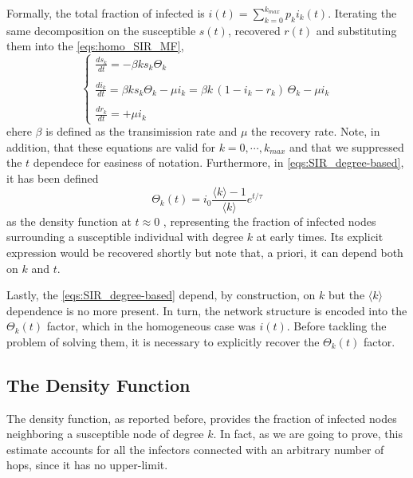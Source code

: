 \documentclass[a4paper,10pt,twoside]{book} %
\theoremstyle{definition}
\begin{document}
Formally, the total fraction of infected is $i(t) = \sum_{k=0}^{k_{max}} p_k i_k(t)$. Iterating the same decomposition on the susceptible $ s(t)$, recovered $ r(t)$ and substituting them into the \autoref{eqs:homo_SIR_MF},
\begin{equation}
	\begin{cases}
		\frac{ds_k}{dt} = -\beta  k  s_k \Theta_k \\ \\ 
		\frac{di_k}{dt} = \beta  k  s_k \Theta_k - \mu i_k = \beta  k  \, (1-i_k-r_k) \, \Theta_k -\mu i_k \label{eqs:SIR_degree-based} \\ \\
		\frac{dr_k}{dt} = +\mu i_k
	\end{cases}	
\end{equation}
ehere $ \beta$ is defined as the transimission rate and $ \mu$ the recovery rate.
Note, in addition, that these equations are valid for $k = 0,\cdots,k_{max}$ and that we suppressed the $t$ dependece for easiness of notation.
Furthermore, in \autoref{eqs:SIR_degree-based}, it has been defined
\begin{equation}
	\Theta_k(t) = i_0 \frac{\langle k \rangle - 1}{\langle k \rangle} e^{t/\tau}
\end{equation}
as the density function at $ t \approx 0$ , representing the fraction of infected nodes surrounding a susceptible individual with degree $k$ at early times. Its explicit expression would be recovered shortly but note that, a priori, it can depend both on $k$ and $t$.

Lastly, the \autoref{eqs:SIR_degree-based} depend, by construction, on $k$ but the $\langle k \rangle$ dependence is no more present. In turn, the network structure is encoded into the $\Theta_k(t)$ factor, which in the homogeneous case was $i(t)$.
Before tackling the problem of solving them, it is necessary to explicitly recover the $\Theta_k(t)$ factor.

\subsection*{The Density Function}
The density function, as reported before, provides the fraction of infected nodes neighboring a susceptible node of degree $k$. In fact, as we are going to prove, this estimate accounts for all the infectors connected with an arbitrary number of hops, since it has no upper-limit. 
\end{document}
